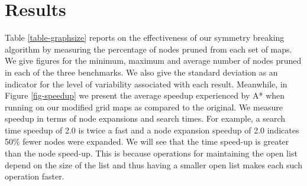 \section{Results}
\label{sec-results}
Table \ref{table-graphsize} reports on the effectiveness of our
symmetry breaking algorithm by measuring the percentage of nodes
pruned from each set of maps.  We give figures for the minimum,
maximum and average number of nodes pruned in each of the three
benchmarks.  We also give the standard deviation as an indicator
for the level of variability associated with each result.  Meanwhile,
in Figure \ref{fig-speedup} we present the average speedup experienced
by A* when running on our modified grid maps as compared to the
original.  We measure speedup in terms of node expansions and search
times.  For example, a search time speedup of 2.0 is twice a fast and
a node expansion speedup of 2.0 indicates 50\% fewer nodes were
expanded.  We will see that the time speed-up is greater than the
node speed-up.  This is because operations for maintaining the open
list depend on the size of the list and thus having a smaller open
list makes each such operation faster.

